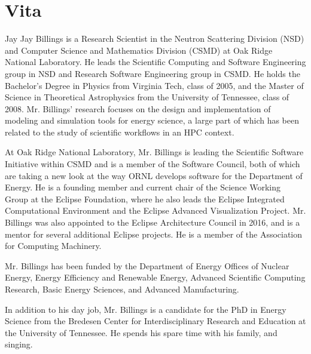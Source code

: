 \chapter*{Vita} \label{ch:vita}

Jay Jay Billings is a Research Scientist in the Neutron Scattering
Division (NSD) and Computer Science and Mathematics Division (CSMD) at Oak Ridge
National Laboratory. He leads the Scientific Computing and Software Engineering group
in NSD and Research Software Engineering group in CSMD. He holds the Bachelor’s
Degree in Physics from Virginia Tech, class of 2005, and the Master of Science
in Theoretical Astrophysics from the University of Tennessee, class of 2008.
Mr. Billings’ research focuses on the design and implementation of modeling and
simulation tools for energy science, a large part of which has been related to
the study of scientific workflows in an HPC context.

At Oak Ridge National Laboratory, Mr. Billings is leading the Scientific
Software Initiative within CSMD and is a member of the Software Council, both of
which are taking a new look at the way ORNL develops software for the Department of
Energy. He is a founding member and current chair of the Science Working Group
at the Eclipse Foundation, where he also leads the Eclipse Integrated
Computational Environment and the Eclipse Advanced Visualization Project. Mr.
Billings was also appointed to the Eclipse Architecture Council in 2016, and is
a mentor for several additional Eclipse projects. He is a member of the
Association for Computing Machinery.

Mr. Billings has been funded by the Department of Energy Offices of Nuclear
Energy, Energy Efficiency and Renewable Energy, Advanced Scientific Computing
Research, Basic Energy Sciences, and Advanced Manufacturing.

In addition to his day job, Mr. Billings is a candidate for the PhD in Energy
Science from the Bredesen Center for Interdisciplinary Research and Education at
the University of Tennessee. He spends his spare time with his family, and
singing.

